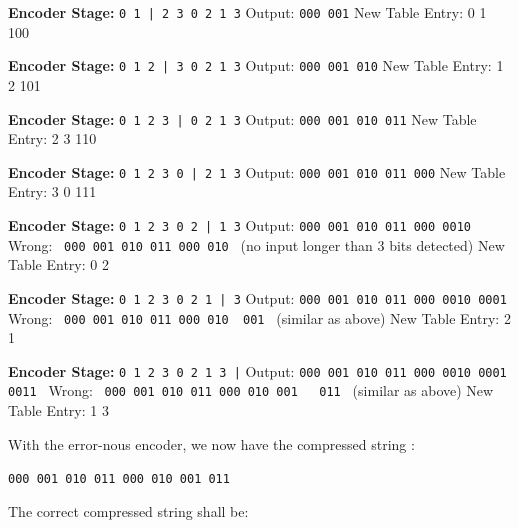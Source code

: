 \documentclass[12pt]{article}
\begin{document}
\textbf{Encoder Stage:} \texttt{0 1 | 2 3 0 2 1 3}
\newline Output: \texttt{000 001}
\newline New Table Entry: 0 1 \textrightarrow{} 100

\textbf{Encoder Stage:} \texttt{0 1 2 | 3 0 2 1 3}
\newline Output: \texttt{000 001 010}
\newline New Table Entry: 1 2 \textrightarrow{} 101

\textbf{Encoder Stage:} \texttt{0 1 2 3 | 0 2 1 3}
\newline Output: \texttt{000 001 010 011}
\newline New Table Entry: 2 3 \textrightarrow{} 110

\textbf{Encoder Stage:} \texttt{0 1 2 3 0 | 2 1 3}
\newline Output: \texttt{000 001 010 011 000}
\newline New Table Entry: 3 0 \textrightarrow{} 111

\textbf{Encoder Stage:} \texttt{0 1 2 3 0 2 | 1 3}
\newline Output: \texttt{000 001 010 011 000 {\color{blue}0010} }
\newline Wrong: \ \texttt{000 001 010 011 000 {\color{red}010} } (no input longer than 3 bits detected)
\newline New Table Entry: 0 2 

\textbf{Encoder Stage:} \texttt{0 1 2 3 0 2 1 | 3}
\newline Output: \texttt{000 001 010 011 000 0010 {\color{blue}0001} }
\newline Wrong: \ \texttt{000 001 010 011 000 010 {\ \color{red}001} } (similar as above)
\newline New Table Entry: 2 1 

\textbf{Encoder Stage:} \texttt{0 1 2 3 0 2 1 3 |}
\newline Output: \texttt{000 001 010 011 000 0010 0001 {\color{blue}0011} }
\newline Wrong: \ \texttt{000 001 010 011 000 010 001  {\ \ \color{red}011} } (similar as above)
\newline New Table Entry: 1 3 

With the error-nous encoder, we now have the compressed string :

\texttt{\color{red}000 001 010 011 000 010 001 011}

The correct compressed string shall be:
\end{document}
